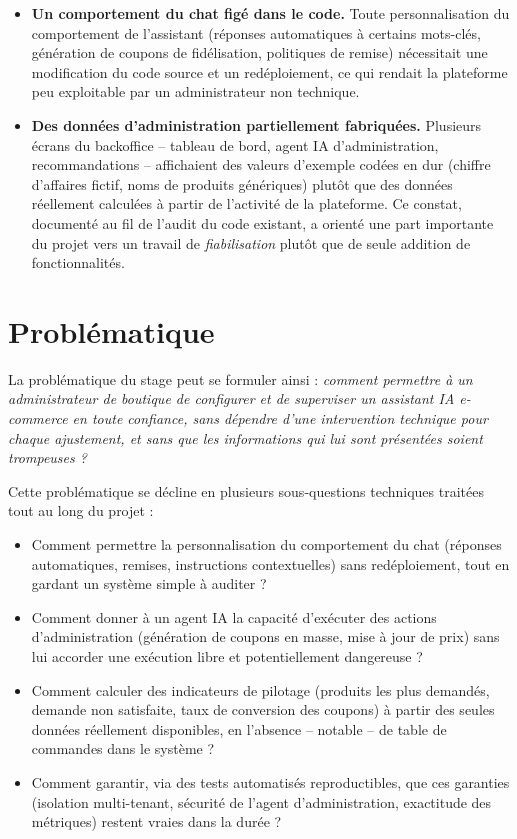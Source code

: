\begin{itemize}
    \item \textbf{Un comportement du chat figé dans le code.} Toute personnalisation du comportement de l'assistant (réponses automatiques à certains mots-clés, génération de coupons de fidélisation, politiques de remise) nécessitait une modification du code source et un redéploiement, ce qui rendait la plateforme peu exploitable par un administrateur non technique.
    \item \textbf{Des données d'administration partiellement fabriquées.} Plusieurs écrans du backoffice -- tableau de bord, agent IA d'administration, recommandations -- affichaient des valeurs d'exemple codées en dur (chiffre d'affaires fictif, noms de produits génériques) plutôt que des données réellement calculées à partir de l'activité de la plateforme. Ce constat, documenté au fil de l'audit du code existant, a orienté une part importante du projet vers un travail de \emph{fiabilisation} plutôt que de seule addition de fonctionnalités.
\end{itemize}

\section{Problématique}

La problématique du stage peut se formuler ainsi : \emph{comment permettre à un administrateur de boutique de configurer et de superviser un assistant IA e-commerce en toute confiance, sans dépendre d'une intervention technique pour chaque ajustement, et sans que les informations qui lui sont présentées soient trompeuses ?}

Cette problématique se décline en plusieurs sous-questions techniques traitées tout au long du projet :

\begin{itemize}
    \item Comment permettre la personnalisation du comportement du chat (réponses automatiques, remises, instructions contextuelles) sans redéploiement, tout en gardant un système simple à auditer ?
    \item Comment donner à un agent IA la capacité d'exécuter des actions d'administration (génération de coupons en masse, mise à jour de prix) sans lui accorder une exécution libre et potentiellement dangereuse ?
    \item Comment calculer des indicateurs de pilotage (produits les plus demandés, demande non satisfaite, taux de conversion des coupons) à partir des seules données réellement disponibles, en l'absence -- notable -- de table de commandes dans le système ?
    \item Comment garantir, via des tests automatisés reproductibles, que ces garanties (isolation multi-tenant, sécurité de l'agent d'administration, exactitude des métriques) restent vraies dans la durée ?
\end{itemize}

